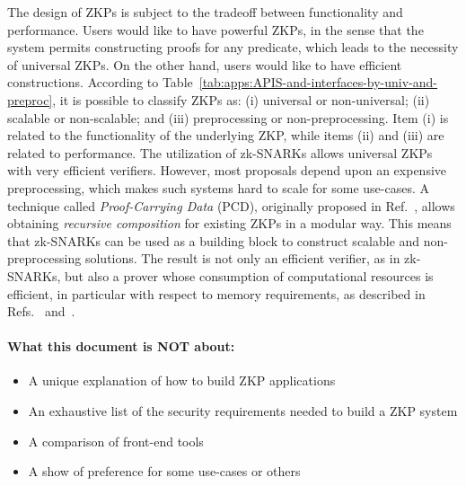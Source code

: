 	The design of ZKPs is subject to the tradeoff between functionality and performance. 
	Users would like to have powerful ZKPs, in the sense that the system permits constructing %
proofs for any predicate, which %
leads to the necessity of universal ZKPs. 
	On the other hand, users would like to have efficient constructions. 
	According to Table~\ref{tab:apps:APIS-and-interfaces-by-univ-and-preproc}, it is possible to classify ZKPs as:
(i) universal or non-universal;
(ii) scalable or non-scalable; and 
(iii) preprocessing or non-preprocessing. 
	Item (i) is related to the functionality of the underlying %
ZKP, while items (ii) and (iii) are related to performance. 
	The utilization of zk-SNARKs allows %
universal ZKPs with very efficient verifiers. 
	However, most proposals %
depend upon an expensive preprocessing, which makes such systems hard to scale for some use-cases. 
	A technique called \textit{Proof-Carrying Data} (PCD), originally proposed in Ref.~\cite{2010:ICS:proof-carrying-data}, 
allows obtaining %
\textit{recursive composition} for existing ZKPs in a modular way. %
	This means that zk-SNARKs can be used as a building block to construct scalable and non-preprocessing solutions.
	The result is not only an efficient verifier, as in zk-SNARKs, but also a prover whose consumption of computational resources is efficient, in particular with respect to memory requirements, as described in Refs.~\cite{2017:Alg:Scalable-Zero-Knowledge-Via-Cycles-of-Elliptic-Curves} and~\cite{2013:Recursive-Composition-and-Bootstrapping-for-SNARKS-and-Proof-carrying-Data}.
\loosen


\paragraph{What this document is NOT about:}
\begin{itemize}
 \item A unique explanation of how to build ZKP applications
 \item An exhaustive list of the security requirements needed to build a ZKP system
 \item A comparison of front-end tools
 \item A show of preference for some use-cases or others
\end{itemize}

